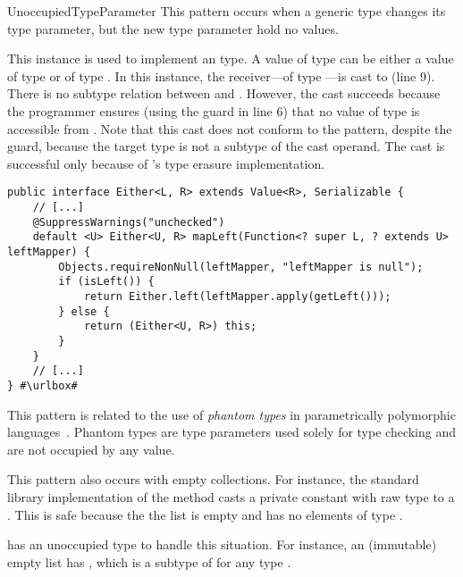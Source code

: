 \begin{pattern}{UnoccupiedTypeParameter}
This pattern occurs when a generic type changes its type parameter,
but the new type parameter hold no values.

\instances{}
This instance%
\def\urlvar{http://bit.ly/vavr_io_vavr_2SMIfI2}
is used to implement an  type.
A value of type  can be either a value of type  or of type .
In this instance, the receiver---of type ---is cast to  (line 9).
There is no subtype relation between  and .
However, the cast succeeds because the programmer ensures
(using the guard  in line 6)
that no value of type  is accessible from .
Note that this cast does not conform to the 
pattern, despite the guard, because the target type is not a subtype of the
cast operand.
The cast is successful only because of \java{}'s type erasure
implementation.

\begin{verbatim}
public interface Either<L, R> extends Value<R>, Serializable {
    // [...]
    @SuppressWarnings("unchecked")
    default <U> Either<U, R> mapLeft(Function<? super L, ? extends U> leftMapper) {
        Objects.requireNonNull(leftMapper, "leftMapper is null");
        if (isLeft()) {
            return Either.left(leftMapper.apply(getLeft()));
        } else {
            return (Either<U, R>) this;
        }
    }
    // [...]
} #\urlbox#
\end{verbatim}


\issues{}
This pattern is related to the use of \emph{phantom types} in parametrically polymorphic languages~\citep{LeijenMeijer99,cheneyHinzePhantomTypes}.
Phantom types are type parameters used solely for type checking and are not occupied by any value.

This pattern also occurs with empty collections.
For instance, the \java{} standard library implementation of the method  casts a private constant with raw type  to a .
This is safe because the the list is empty and has no elements of type .

\scala{} has an unoccupied  type to handle this situation.
For instance, an (immutable) empty list has ,
which is a subtype of  for any type .

\end{pattern}